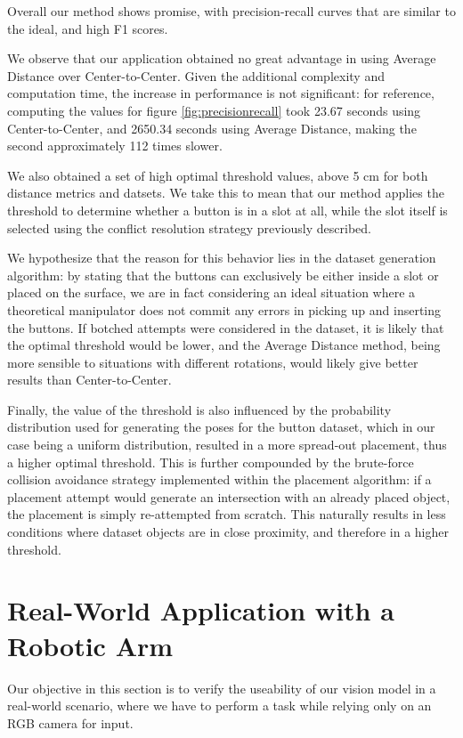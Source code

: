 Overall our method shows promise, with precision-recall curves that are similar to the ideal, and high F1 scores.

We observe that our application obtained no great advantage in using Average Distance over Center-to-Center. Given the additional complexity and computation time, the increase in performance is not significant: for reference, computing the values for figure \ref{fig:precisionrecall} took 23.67 seconds using Center-to-Center, and 2650.34 seconds using Average Distance, making the second approximately 112 times slower.

We also obtained a set of high optimal threshold values, above 5 cm for both distance metrics and datsets. We take this to mean that our method applies the threshold to determine whether a button is in a slot at all, while the slot itself is selected using the conflict resolution strategy previously described.

We hypothesize that the reason for this behavior lies in the dataset generation algorithm: by stating that the buttons can exclusively be either inside a slot or placed on the surface, we are in fact considering an ideal situation where a theoretical manipulator does not commit any errors in picking up and inserting the buttons. If botched attempts were considered in the dataset, it is likely that the optimal threshold would be lower, and the Average Distance method, being more sensible to situations with different rotations, would likely give better results than Center-to-Center.

Finally, the value of the threshold is also influenced by the probability distribution used for generating the poses for the button dataset, which in our case being a uniform distribution, resulted in a more spread-out placement, thus a higher optimal threshold. This is further compounded by the brute-force collision avoidance strategy implemented within the placement algorithm: if a placement attempt would generate an intersection with an already placed object, the placement is simply re-attempted from scratch. This naturally results in less conditions where dataset objects are in close proximity, and therefore in a higher threshold.

\section{Real-World Application with a Robotic Arm}

Our objective in this section is to verify the useability of our vision model in a real-world scenario, where we have to perform a task while relying only on an RGB camera for input.
